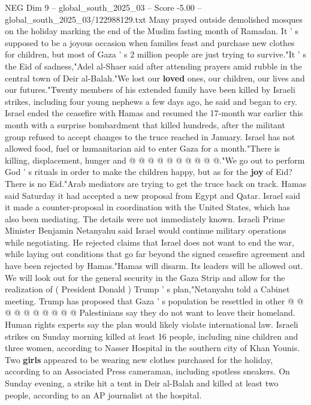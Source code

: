\begin{textsample}{NEG Dim 9 – global\_south\_2025\_03 – Score -5.00 – global\_south\_2025\_03/122988129.txt}  \label{ex:f9_neg_393}
Many prayed outside demolished mosques on the holiday marking the end of the Muslim fasting month of Ramadan.
It ' s supposed to be a joyous occasion when families feast and purchase new clothes for children, but most of Gaza ' s 2 million people are just trying to survive."It ' s the Eid of sadness,"Adel al-Shaer said after attending prayers amid rubble in the central town of Deir al-Balah."We lost our \textbf{loved} ones, our children, our lives and our futures."Twenty members of his extended family have been killed by Israeli strikes, including four young nephews a few days ago, he said and began to cry.
Israel ended the ceasefire with Hamas and resumed the 17-month war earlier this month with a surprise bombardment that killed hundreds, after the militant group refused to accept changes to the truce reached in January.
Israel has not allowed food, fuel or humanitarian aid to enter Gaza for a month."There is killing, displacement, hunger and @ @ @ @ @ @ @ @ @ @."We go out to perform God ' s rituals in order to make the children happy, but as for the \textbf{joy} of Eid?
There is no Eid."Arab mediators are trying to get the truce back on track.
Hamas said Saturday it had accepted a new proposal from Egypt and Qatar.
Israel said it made a counter-proposal in coordination with the United States, which has also been mediating.
The details were not immediately known.
Israeli Prime Minister Benjamin Netanyahu said Israel would continue military operations while negotiating.
He rejected claims that Israel does not want to end the war, while laying out conditions that go far beyond the signed ceasefire agreement and have been rejected by Hamas."Hamas will disarm.
Its leaders will be allowed out.
We will look out for the general security in the Gaza Strip and allow for the realization of ( President Donald ) Trump ' s plan,"Netanyahu told a Cabinet meeting.
Trump has proposed that Gaza ' s population be resettled in other @ @ @ @ @ @ @ @ @ @ Palestinians say they do not want to leave their homeland.
Human rights experts say the plan would likely violate international law.
Israeli strikes on Sunday morning killed at least 16 people, including nine children and three women, according to Nasser Hospital in the southern city of Khan Younis.
Two \textbf{girls} appeared to be wearing new clothes purchased for the holiday, according to an Associated Press cameraman, including spotless sneakers.
On Sunday evening, a strike hit a tent in Deir al-Balah and killed at least two people, according to an AP journalist at the hospital.

\end{textsample}
